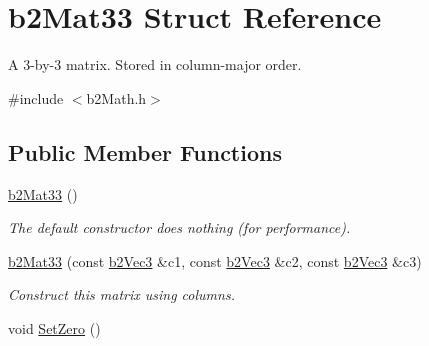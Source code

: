 \hypertarget{structb2_mat33}{\section{b2\-Mat33 Struct Reference}
\label{structb2_mat33}
}


A 3-\/by-\/3 matrix. Stored in column-\/major order.  




{\ttfamily \#include $<$b2\-Math.\-h$>$}

\subsection*{Public Member Functions}
\begin{DoxyCompactItemize}
\item 
\hypertarget{structb2_mat33_a1f4d7ddf1c8a202fc08ec64dfe191463}{\hyperlink{structb2_mat33_a1f4d7ddf1c8a202fc08ec64dfe191463}{b2\-Mat33} ()}\label{structb2_mat33_a1f4d7ddf1c8a202fc08ec64dfe191463}

\begin{DoxyCompactList}\small\item\em The default constructor does nothing (for performance). \end{DoxyCompactList}\item 
\hypertarget{structb2_mat33_a36d99a037008776c8d09fe0aeb5c759c}{\hyperlink{structb2_mat33_a36d99a037008776c8d09fe0aeb5c759c}{b2\-Mat33} (const \hyperlink{structb2_vec3}{b2\-Vec3} \&c1, const \hyperlink{structb2_vec3}{b2\-Vec3} \&c2, const \hyperlink{structb2_vec3}{b2\-Vec3} \&c3)}\label{structb2_mat33_a36d99a037008776c8d09fe0aeb5c759c}

\begin{DoxyCompactList}\small\item\em Construct this matrix using columns. \end{DoxyCompactList}\item 
\hypertarget{structb2_mat33_a42fc6953b025e1c8b59717d0ee7accde}{void \hyperlink{structb2_mat33_a42fc6953b025e1c8b59717d0ee7accde}{Set\-Zero} ()}\label{structb2_mat33_a42fc6953b025e1c8b59717d0ee7accde}


\end{DoxyCompactItemize}
